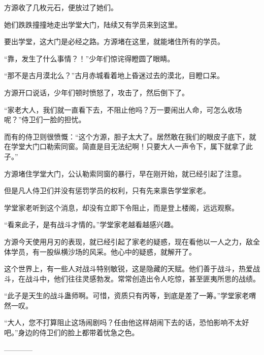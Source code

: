 \begin{this_body}
方源收了几枚元石，便放过了她们。

她们跌跌撞撞地走出学堂大门，陆续又有学员来到这里。

要出学堂，这大门是必经之路。方源堵在这里，就能堵住所有的学员。

“靠，发生了什么事情？！”少年们惊诧得瞪圆了眼睛。

“那不是古月漠北么？”古月赤城看着地上昏迷过去的漠北，目瞪口呆。

方源开口说话，少年们顿时愤怒了，攻击了，然后倒下了。

“家老大人，我们就一直看下去，不阻止他吗？万一要闹出人命，可怎么收场呢？”侍卫们一脸的担忧。

而有的侍卫则很愤慨：“这个方源，胆子太大了。居然敢在我们的眼皮子底下，就在学堂大门口勒索同窗。简直是目无法纪啊！只要大人一声令下，属下就拿了此子。”

方源堵住学堂大门，公认勒索同窗的暴行，早在刚开始，就已经引起了注意。

但是凡人侍卫们并没有惩罚学员的权利，只有先来禀告学堂家老。

学堂家老听到这个消息，却没有立即下令阻止，而是登上楼阁，远远观察。

“看来此子，是有战斗才情的。”学堂家老越看越感兴趣。

方源今天使用月刃的表现，就已经引起了家老的疑惑，现在看他以一人之力，敌全体学员，有一股纵横沙场的风采。他心中的疑惑，就解开了。

这个世界上，有一些人对战斗特别敏锐，这是隐藏的天赋。他们善于战斗，热爱战斗，在战斗中，他们往往灵感勃发。常常创造出令人吃惊，甚至匪夷所思的战绩。

“此子是天生的战斗蛊师啊。可惜，资质只有丙等，到底是差了一筹。”学堂家老喟然一叹。

“大人，您不打算阻止这场闹剧吗？任由他这样胡闹下去的话，恐怕影响不太好吧。”身边的侍卫们的脸上都带着忧急之色。

------------

\end{this_body}

